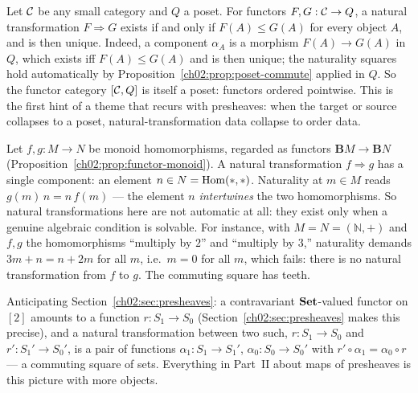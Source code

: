 \begin{example}\label{ch02:ex:nat-poset}
Let $\mathcal{C}$ be any small category and $Q$ a poset. For functors
$F, G : \mathcal{C} \to Q$, a natural transformation $F \Rightarrow G$ exists if
and only if $F(A) \le G(A)$ for every object $A$, and is then unique.
Indeed, a component $\alpha_A$ is a morphism $F(A) \to G(A)$ in $Q$,
which exists iff $F(A) \le G(A)$ and is then unique; the naturality
squares hold automatically by
Proposition~\ref{ch02:prop:poset-commute} applied in $Q$. So the functor
category $[\mathcal{C}, Q]$ is itself a poset: functors ordered pointwise. This
is the first hint of a theme that recurs with presheaves: when the target
or source collapses to a poset, natural-transformation data collapse to
order data.
\end{example}

\begin{example}\label{ch02:ex:nat-monoid}
Let $f, g : M \to N$ be monoid homomorphisms, regarded as functors
$\mathbf{B}M \to \mathbf{B}N$
(Proposition~\ref{ch02:prop:functor-monoid}). A natural transformation
$f \Rightarrow g$ has a single component: an element
$n \in N = \mathrm{Hom}(\ast, \ast)$. Naturality at $m \in M$ reads
$g(m)\, n = n\, f(m)$ --- the element $n$ \emph{intertwines} the two
homomorphisms. So natural transformations here are not automatic at all:
they exist only when a genuine algebraic condition is solvable. For
instance, with $M = N = (\mathbb{N}, +)$ and $f, g$ the homomorphisms
``multiply by $2$'' and ``multiply by $3$,'' naturality demands
$3m + n = n + 2m$ for all $m$, i.e.\ $m = 0$ for all $m$, which fails:
there is no natural transformation from $f$ to $g$. The commuting square
has teeth.
\end{example}

\begin{example}\label{ch02:ex:nat-two-chain}
Anticipating Section~\ref{ch02:sec:presheaves}: a contravariant
$\mathbf{Set}$-valued functor on $[2]$ amounts to a function
$r : S_1 \to S_0$ (Section~\ref{ch02:sec:presheaves} makes this precise),
and a natural transformation between two such, $r : S_1 \to S_0$ and
$r' : S_1' \to S_0'$, is a pair of functions
$\alpha_1 : S_1 \to S_1'$, $\alpha_0 : S_0 \to S_0'$ with
$r' \circ \alpha_1 = \alpha_0 \circ r$ --- a commuting square of sets.
Everything in Part~II about maps of presheaves is this picture with more
objects.
\end{example}

